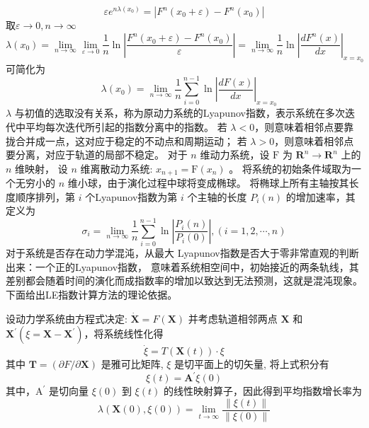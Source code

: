 \begin{equation}
    \varepsilon e^{n \lambda\left(x_{0}\right)}=\left|F^{n}\left(x_{0}+\varepsilon\right)-F^{n}\left(x_{0}\right)\right|
\end{equation}
取$\varepsilon \rightarrow 0, n \rightarrow \infty$
\begin{equation}
    \lambda\left(x_{0}\right)=\lim _{n \rightarrow \infty} \lim _{\varepsilon \rightarrow 0}
     \frac{1}{n} \ln \left|\frac{F^{n}\left(x_{0}+\varepsilon\right)-F^{n}\left(x_{0}\right)}
     {\varepsilon}\right|=\lim _{n \rightarrow \infty} \frac{1}{n} \ln \left|\frac{d F^{n}(x)}{d x}
     \right|_{x=x_{0}}
\end{equation}
可简化为
\begin{equation}
    \quad \lambda\left(x_{0}\right)=\lim _{n \rightarrow \infty} \frac{1}{n} \sum_{i=0}^{n-1} \ln \left|\frac{d F(x)}{d x}\right|_{x=x_{0}}
\end{equation} 
$\lambda$ 与初值的选取没有关系，称为原动力系统的Lyapunov指数，表示系统在多次迭代中平均每次迭代所引起的指数分离中的指数。
若 $\lambda<0$，则意味着相邻点要靠拢合并成一点，这对应于稳定的不动点和周期运动；
若 $\lambda>0$，则意味着相邻点要分离，对应于轨道的局部不稳定。
对于 $n$ 维动力系统，设 $\mathrm{F}$ 为 $\mathbf{R}^{n} \rightarrow \mathbf{R}^{n}$ 上的 $n$ 维映射，
设 $n$ 维离散动力系统: $x_{n+1}=\mathrm{F}\left(x_{n}\right)$ 。
将系统的初始条件域取为一个无穷小的 $n$ 维小球，由于演化过程中球将变成椭球。
将椭球上所有主轴按其长度顺序排列，第 $i$ 个Lyapunov指数为第 $i$ 个主轴的长度 $P_{i}(n)$ 的增加速率，其定义为
\begin{equation}
    \sigma_{i}=\lim _{n \rightarrow \infty} \frac{1}{n} \sum_{i=0}^{n-1} \ln \left|\frac{P_{i}(n)}{P_{i}(0)}\right|,(i=1,2, \cdots, n)
\end{equation}
对于系统是否存在动力学混沌，从最大 Lyapunov指数是否大于零非常直观的判断出来：一个正的Lyapunov指数，
意味着系统相空间中，初始接近的两条轨线，其差别都会随着时间的演化而成指数率的增加以致达到无法预测，这就是混沌现象。
下面给出LE指数计算方法的理论依据。\par
设动力学系统由方程式决定: $\dot{\mathbf{X}}=F(\mathbf{X})$
并考虑轨道相邻两点 $\mathbf{X}$ 和 $\mathbf{X}^{\prime}\left(\xi=\mathbf{X}-\mathbf{X}^{\prime}\right)$，将系统线性化得
$$\dot{\xi}=T(\mathbf{X}(t)) \cdot \xi$$
其中 $\mathbf{T}=(\partial F / \partial \mathbf{X})$ 是雅可比矩阵, $\xi$ 是切平面上的切矢量, 将上式积分有
$$\xi(t)=\mathbf{A}^{\prime} \xi(0)$$
其中，$\mathrm{A}^{\prime}$ 是切向量 $\xi(0)$ 到 $\xi(t)$ 的线性映射算子，因此得到平均指数增长率为
$$\lambda(\mathbf{X}(0), \xi(0))=\lim _{t \rightarrow \infty} \frac{\|\xi(t)\|}{\|\xi(0)\|}$$
